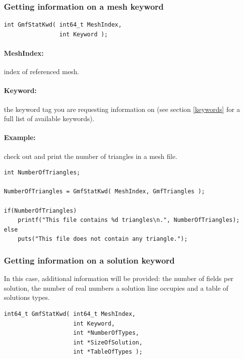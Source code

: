 \documentclass[a4paper,12pt]{article}
\begin{document}
\subsubsection{Getting information on a mesh keyword}

\begin{tt}
\begin{verbatim}
int GmfStatKwd( int64_t MeshIndex,
                int Keyword );
\end{verbatim}
\end{tt}
\normalfont

\paragraph{MeshIndex:} index of referenced mesh.

\paragraph{Keyword:} the keyword tag you are requesting information on (see section \ref{keywords} for a full list of available keywords).

\paragraph{Example:} check out and print the number of triangles in a mesh file.

\begin{tt}
\begin{verbatim}
int NumberOfTriangles;

NumberOfTriangles = GmfStatKwd( MeshIndex, GmfTriangles );

if(NumberOfTriangles)
    printf("This file contains %d triangles\n.", NumberOfTriangles);
else
    puts("This file does not contain any triangle.");
\end{verbatim}
\end{tt}
\normalfont

\subsubsection{Getting information on a solution keyword}
In this case, additional information will be provided: the number of fields per solution, the number of real numbers a solution line occupies and a table of solutions types.

\begin{tt}
\begin{verbatim}
int64_t GmfStatKwd( int64_t MeshIndex,
                    int Keyword,
                    int *NumberOfTypes,
                    int *SizeOfSolution,
                    int *TableOfTypes );
\end{verbatim}
\end{tt}
\normalfont
\end{document}
